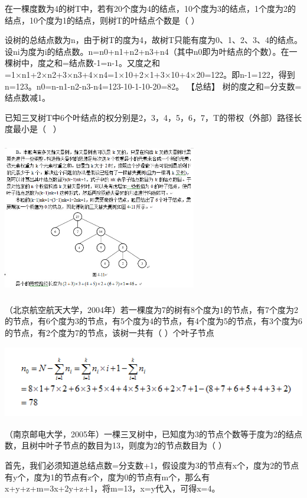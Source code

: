 \question 在一棵度数为4的树T中，若有20个度为4的结点，10个度为3的结点，1个度为2的结点，10个度为1的结点，则树T的叶结点个数是（
）
\par{}
\begin{solution}设树的总结点数为n，由于树T的度为4，故树T只能有度为0、1、2、3、4的结点。设ni为度为i的结点数。n=n0+n1+n2+n3+n4（其中n0即为叶结点的个数）。在一棵树中，度之和=结点数-1=n-1。又度之和=1×n1+2×n2+3×n3+4×n4=1×10+2×1+3×10+4×20=122。即n-1=122，得到n=123。n0=n-n1-n2-n3-n4=123-10-1-10-20=82。
【总结】 树的度之和=分支数=结点数减1。
\end{solution}
\question 已知三叉树T中6个叶结点的权分别是2，3，4，5，6，7，T的带权（外部）路径长度最小是（
~）
\par{}
\begin{solution}\includegraphics[width=3.33333in,height=2.64583in]{computerassets/e9d6a97804263e5cf8b47d8cd8b830dd.jpeg}
\end{solution}
\question （北京航空航天大学，2004年）若一棵度为7的树有8个度为1的节点，有7个度为2的节点，有6个度为3的节点，有5个度为4的节点，有4个度为5的节点，有3个度为6的节点，有2个度为7的节点，该树一共有（
）个叶子节点
\par{}
\begin{solution}\includegraphics[width=5.42708in,height=1.25000in]{computerassets/8640ea38b1bda9fc51d44e6d23929ade.png}
\end{solution}
\question （南京邮电大学，2005年）一棵三叉树中，已知度为3的节点个数等于度为2的结点数，且树中叶子节点的数目为13，则度为2的节点数目为（
）
\par{}
\begin{solution}首先，我们必须知道总结点数=分支数+1，假设度为3的节点有x个，度为2的节点有y个，度为1的节点有z个，度为0的节点有m个，那么有x+y+z+m=3x+2y+z+1，将m=13，x=y代入，可得x=4。
\end{solution}
